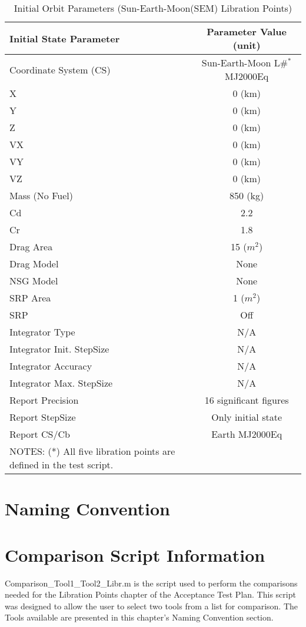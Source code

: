 \begin{table}[htbp!]
\centering \caption{Initial Orbit Parameters (Sun-Earth-Moon(SEM)
Libration Points)}
      \begin{tabular}{lc}
      \hline\hline
            Initial State Parameter & Parameter Value (unit)\\
            \hline
            Coordinate System (CS) & Sun-Earth-Moon L\#$^*$ MJ2000Eq\\
            X & 0 (km)\\
            Y & 0 (km)\\
            Z & 0 (km)\\
            VX & 0 (km)\\
            VY & 0 (km)\\
            VZ & 0 (km)\\
            Mass (No Fuel) & 850 (kg)\\
            Cd & 2.2\\
            Cr & 1.8\\
            Drag Area & 15 ($m^2$)\\
            Drag Model & None\\
            NSG Model & None\\
            SRP Area & 1 ($m^2$)\\
            SRP & Off\\
            Integrator Type & N/A\\
            Integrator Init. StepSize & N/A\\
            Integrator Accuracy & N/A\\
            Integrator Max. StepSize & N/A\\
            Report Precision & 16 significant figures\\
            Report StepSize & Only initial state\\
            Report CS/Cb & Earth MJ2000Eq\\
      \hline\hline
      NOTES: (*) All five libration points are defined in the test
      script.
      \label{Table:InitialSEMstate}
\end{tabular}
\end{table}

\section{Naming Convention}
\label{nameConvLibPoint}


\section{Comparison Script Information}
Comparison\_Tool1\_Tool2\_Libr.m is the script used to perform the
comparisons needed for the Libration Points chapter of the
Acceptance Test Plan. This script was designed to allow the user to
select two tools from a list for comparison. The Tools available are
presented in this chapter's Naming Convention section.\\

